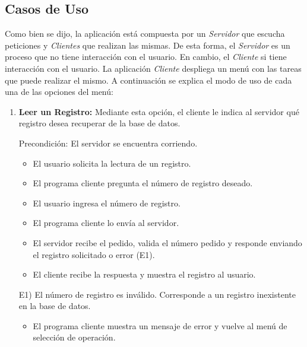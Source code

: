 \documentclass[a4paper,10pt]{article}
\begin{document}
			\subsection{Casos de Uso}

			Como bien se dijo, la aplicaci\'on est\'a compuesta por un \emph{Servidor} que escucha peticiones y \emph{Clientes} que realizan las mismas. 
			De esta forma, el \emph{Servidor} es un proceso que no tiene interacci\'on con el usuario. En cambio, el \emph{Cliente} si tiene interacci\'on
			con el usuario. La aplicaci\'on \emph{Cliente} despliega un men\'u con las tareas que puede realizar el mismo. A continuaci\'on se 
			explica el modo de uso de cada una de las opciones del men\'u: 

			\begin{enumerate}
                                
                \item \textbf{Leer un Registro:} Mediante esta opci\'on, el cliente le indica al servidor qu\'e registro desea recuperar de la base de datos.

                Precondici\'on: El servidor se encuentra corriendo. 
                \begin{itemize}
                    \item El usuario solicita la lectura de un registro. 
                    \item El programa cliente pregunta el n\'umero de registro deseado. 
		    \item El usuario ingresa el n\'umero de registro. 
                    \item El programa cliente lo env\'ia al servidor.
                    \item El servidor recibe el pedido, valida el n\'umero pedido y responde enviando el registro solicitado o error (E1). 
		    \item El cliente recibe la respuesta y muestra el registro al usuario.
                \end{itemize}
                
                E1) El n\'umero de registro es inv\'alido. Corresponde a un registro inexistente en la base de datos. 
                    \begin{itemize}
                        \item El programa cliente muestra un mensaje de error y vuelve al men\'u de selecci\'on de operaci\'on.
				    \end{itemize}
                

\end{enumerate}
\end{document}
